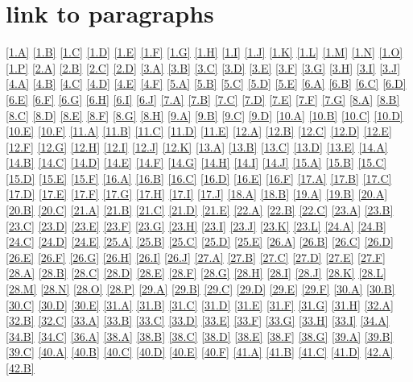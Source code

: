 \setcounter{chapter}{-1}
\chapter{link to paragraphs}\label{links}

\ref{1.A}  \ref{1.B}  \ref{1.C}  \ref{1.D}  \ref{1.E}  \ref{1.F}  \ref{1.G}  \ref{1.H}  \ref{1.I}  \ref{1.J}  \ref{1.K}  \ref{1.L}  \ref{1.M}  \ref{1.N}  \ref{1.O}  \ref{1.P}  \ref{2.A}  \ref{2.B}  \ref{2.C}  \ref{2.D}  \ref{3.A}  \ref{3.B}  \ref{3.C}  \ref{3.D}  \ref{3.E}  \ref{3.F}  \ref{3.G}  \ref{3.H}  \ref{3.I}  \ref{3.J}  \ref{4.A}  \ref{4.B}  \ref{4.C}  \ref{4.D}  \ref{4.E}  \ref{4.F}  \ref{5.A}  \ref{5.B}  \ref{5.C}  \ref{5.D}  \ref{5.E}  \ref{6.A}  \ref{6.B}  \ref{6.C}  \ref{6.D}  \ref{6.E}  \ref{6.F}  \ref{6.G}  \ref{6.H}  \ref{6.I}  \ref{6.J}  \ref{7.A}  \ref{7.B}  \ref{7.C}  \ref{7.D}  \ref{7.E}  \ref{7.F}  \ref{7.G}  \ref{8.A}  \ref{8.B}  \ref{8.C}  \ref{8.D}  \ref{8.E}  \ref{8.F}  \ref{8.G}  \ref{8.H}  \ref{9.A}  \ref{9.B}  \ref{9.C}  \ref{9.D}  \ref{10.A}  \ref{10.B}  \ref{10.C}  \ref{10.D}  \ref{10.E}  \ref{10.F}  \ref{11.A}  \ref{11.B}  \ref{11.C}  \ref{11.D}  \ref{11.E}  \ref{12.A}  \ref{12.B}  \ref{12.C}  \ref{12.D}  \ref{12.E}  \ref{12.F}  \ref{12.G}  \ref{12.H}  \ref{12.I}  \ref{12.J}  \ref{12.K}  \ref{13.A}  \ref{13.B}  \ref{13.C}  \ref{13.D}  \ref{13.E}  \ref{14.A}  \ref{14.B}  \ref{14.C}  \ref{14.D}  \ref{14.E}  \ref{14.F}  \ref{14.G}  \ref{14.H}  \ref{14.I}  \ref{14.J}  \ref{15.A}  \ref{15.B}  \ref{15.C}  \ref{15.D}  \ref{15.E}  \ref{15.F}  \ref{16.A}  \ref{16.B}  \ref{16.C}  \ref{16.D}  \ref{16.E}  \ref{16.F}  \ref{17.A}  \ref{17.B}  \ref{17.C}  \ref{17.D}  \ref{17.E}  \ref{17.F}  \ref{17.G}  \ref{17.H}  \ref{17.I}  \ref{17.J}  \ref{18.A}  \ref{18.B}  \ref{19.A}  \ref{19.B}  \ref{20.A}  \ref{20.B}  \ref{20.C}  \ref{21.A}  \ref{21.B}  \ref{21.C}  \ref{21.D}  \ref{21.E}  \ref{22.A}  \ref{22.B}  \ref{22.C}  \ref{23.A}  \ref{23.B}  \ref{23.C}  \ref{23.D}  \ref{23.E}  \ref{23.F}  \ref{23.G}  \ref{23.H}  \ref{23.I}  \ref{23.J}  \ref{23.K}  \ref{23.L}  \ref{24.A}  \ref{24.B}  \ref{24.C}  \ref{24.D}  \ref{24.E}  \ref{25.A}  \ref{25.B}  \ref{25.C}  \ref{25.D}  \ref{25.E}  \ref{26.A}  \ref{26.B}  \ref{26.C}  \ref{26.D}  \ref{26.E}  \ref{26.F}  \ref{26.G}  \ref{26.H}  \ref{26.I}  \ref{26.J}  \ref{27.A}  \ref{27.B}  \ref{27.C}  \ref{27.D}  \ref{27.E}  \ref{27.F}  \ref{28.A}  \ref{28.B}  \ref{28.C}  \ref{28.D}  \ref{28.E}  \ref{28.F}  \ref{28.G}  \ref{28.H}  \ref{28.I}  \ref{28.J}  \ref{28.K}  \ref{28.L}  \ref{28.M}  \ref{28.N}  \ref{28.O}  \ref{28.P}  \ref{29.A}  \ref{29.B}  \ref{29.C}  \ref{29.D}  \ref{29.E}  \ref{29.F}  \ref{30.A}  \ref{30.B}  \ref{30.C}  \ref{30.D}  \ref{30.E}  \ref{31.A}  \ref{31.B}  \ref{31.C}  \ref{31.D}  \ref{31.E}  \ref{31.F}  \ref{31.G}  \ref{31.H}  \ref{32.A}  \ref{32.B}  \ref{32.C}  \ref{33.A}  \ref{33.B}  \ref{33.C}  \ref{33.D}  \ref{33.E}  \ref{33.F}  \ref{33.G}  \ref{33.H}  \ref{33.I}  \ref{34.A}  \ref{34.B}  \ref{34.C}  \ref{36.A}  \ref{38.A}  \ref{38.B}  \ref{38.C}  \ref{38.D}  \ref{38.E}  \ref{38.F}  \ref{38.G}  \ref{39.A}  \ref{39.B}  \ref{39.C}  \ref{40.A}  \ref{40.B}  \ref{40.C}  \ref{40.D}  \ref{40.E}  \ref{40.F}  \ref{41.A}  \ref{41.B}  \ref{41.C}  \ref{41.D}  \ref{42.A}  \ref{42.B}  


